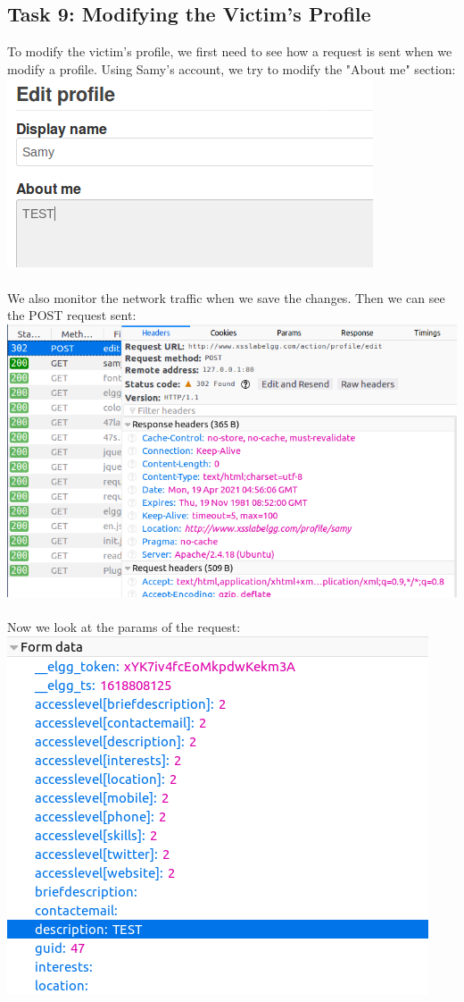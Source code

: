 \documentclass[a4paper]{article}
\begin{document}
\subsection{Task 9: Modifying the Victim’s Profile}
To modify the victim's profile, we first need to see how a request is sent when we modify a profile. Using Samy's account, we try to modify the "About me" section:\\
\includegraphics[scale=0.7]{2/18.png}\\\\
We also monitor the network traffic when we save the changes. Then we can see the POST request sent:\\
\includegraphics[scale=0.7]{2/19.png}\\\\
Now we look at the params of the request:\\
\includegraphics[scale=0.7]{2/20.png}\\\\
\end{document}
